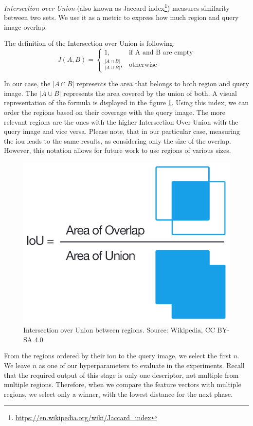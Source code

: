 \emph{Intersection over Union} (also known as Jaccard index\footnote{\href{https://en.wikipedia.org/wiki/Jaccard_index}{https://en.wikipedia.org/wiki/Jaccard\_index}}) measures similarity between two sets. We use it as a metric to express how much region and query image overlap. 

The definition of the Intersection over Union is following:
$$
    J(A, B) = 
    \begin{cases}
      1, & \text{if\ A and B are empty} \\
      \frac{|A \cap B|}{|A \cup B|}, & \text{otherwise}
    \end{cases}
$$

In our case, the $|A \cap B|$ represents the area that belongs to both region and query image. The  $|A \cup B|$ represents the area covered by the union of both. A visual representation of the formula is displayed in the figure \ref{fig:intersection_over_union}. Using this index, we can order the regions based on their coverage with the query image. The more relevant regions are the ones with the higher Intersection Over Union with the query image and vice versa. Please note, that in our particular case, measuring the \acrshort{iou} leads to the same results, as considering only the size of the overlap. However, this notation allows for future work to use regions of various sizes.

\begin{figure}
    \centering
	\includegraphics[width=0.4\linewidth]{img/Intersection_over_Union_-_visual_equation.png}
	\caption[Intersection over Union between regions]{Intersection over Union between regions. Source: Wikipedia, CC BY-SA 4.0}
	\label{fig:intersection_over_union}
\end{figure}

From the regions ordered by their \acrshort{iou} to the query image, we select the first $n$. We leave $n$ as one of our hyperparameters to evaluate in the experiments. Recall that the required output of this stage is only one descriptor, not multiple from multiple regions. Therefore, when we compare the feature vectors with multiple regions, we select only a winner, with the lowest distance for the next phase. 

